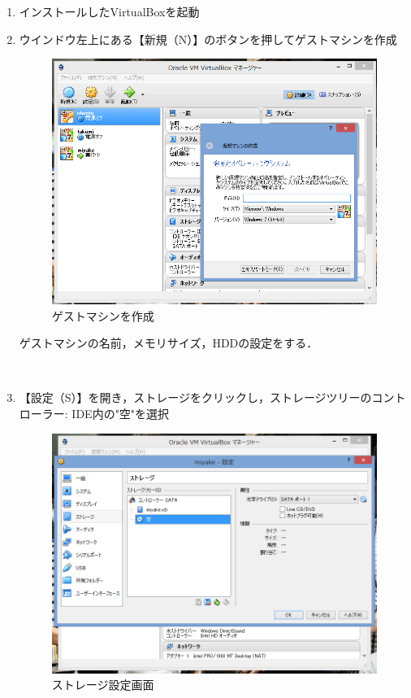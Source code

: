 \begin{enumerate}
  \item インストールしたVirtualBoxを起動
  \item ウインドウ左上にある【新規（N）】のボタンを押してゲストマシンを作成

\begin{figure}[H]
\centering
\includegraphics[width=15cm]{sinki.PNG}
\caption{ゲストマシンを作成}\label{サンプル図}
\end{figure}
ゲストマシンの名前，メモリサイズ，HDDの設定をする．


　\item 【設定（S）】を開き，ストレージをクリックし，ストレージツリーのコントローラー: IDE内の"空"を選択
\begin{figure}[H]
\centering
\includegraphics[width=15cm]{settei.PNG}
\caption{ストレージ設定画面}\label{サンプル図}
\end{figure}


\end{enumerate}
